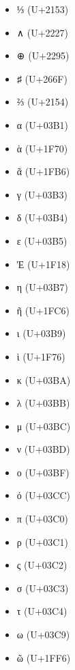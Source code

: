 \documentclass[a4paper]{article}
\begin{document}
\begin{itemize}
    \item {\libertine ⅓ } (U+2153)
    \item {\libertine ∧ } (U+2227)
    \item {\libertine ⊕ } (U+2295)
    \item {\libertine ♯ } (U+266F)
    \item {\libertine ⅔ } (U+2154)
    \item {\libertine α } (U+03B1)
    \item {\libertine ὰ } (U+1F70)
    \item {\libertine ᾶ } (U+1FB6)
    \item {\libertine γ } (U+03B3)
    \item {\libertine δ } (U+03B4)
    \item {\libertine ε } (U+03B5)
    \item {\libertine Ἐ } (U+1F18)
    \item {\libertine η } (U+03B7)
    \item {\libertine ῆ } (U+1FC6)
    \item {\libertine ι } (U+03B9)
    \item {\libertine ὶ } (U+1F76)
    \item {\libertine κ } (U+03BA)
    \item {\libertine λ } (U+03BB)
    \item {\libertine μ } (U+03BC)
    \item {\libertine ν } (U+03BD)
    \item {\libertine ο } (U+03BF)
    \item {\libertine ό } (U+03CC)
    \item {\libertine π } (U+03C0)
    \item {\libertine ρ } (U+03C1)
    \item {\libertine ς } (U+03C2)
    \item {\libertine σ } (U+03C3)
    \item {\libertine τ } (U+03C4)
    \item {\libertine ω } (U+03C9)
    \item {\libertine ῶ } (U+1FF6)


\end{itemize}
\end{document}
